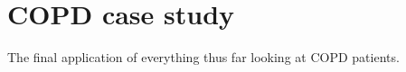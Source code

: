 \chapter{COPD case study}
\label{chp:copd}

The final application of everything thus far looking at COPD patients.
